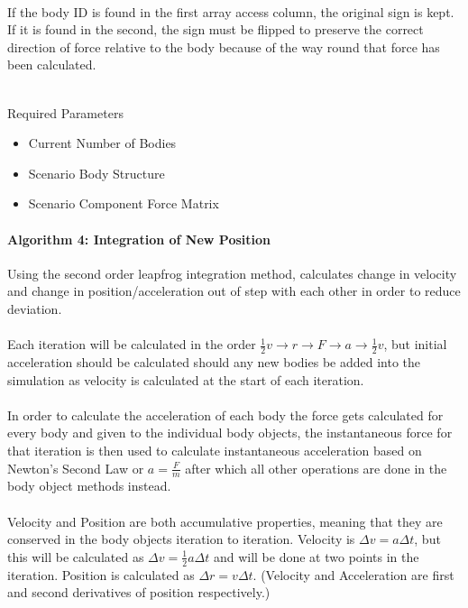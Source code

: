 \paragraph{} If the body ID is found in the first array access column, the original sign is kept. If it is found in the second, the sign must be flipped to preserve the correct direction of force relative to the body because of the way round that force has been calculated. \\\

Required Parameters
\begin{itemize}
\item Current Number of Bodies
\item Scenario Body Structure
\item Scenario Component Force Matrix
\end{itemize}

\pagebreak
\paragraph{Algorithm 4: Integration of New Position}
Using the second order leapfrog integration method, calculates change in velocity and change in position/acceleration out of step with each other in order to reduce deviation.

\paragraph{}
Each iteration will be calculated in the order $\frac{1}{2}v \rightarrow r \rightarrow F \rightarrow a \rightarrow \frac{1}{2}v$, but initial acceleration should be calculated should any new bodies be added into the simulation as velocity is calculated at the start of each iteration.

\paragraph{}
In order to calculate the acceleration of each body the force gets calculated for every body and given to the individual body objects, the instantaneous force for that iteration is then used to calculate instantaneous acceleration based on Newton's Second Law or $a=\frac{F}{m}$ after which all other operations are done in the body object methods instead.

\paragraph{}
Velocity and Position are both accumulative properties, meaning that they are conserved in the body objects iteration to iteration. Velocity is $\Delta{v}=a\Delta{t}$, but this will be calculated as $\Delta{v}=\frac{1}{2}a\Delta{t}$ and will be done at two points in the iteration. Position is calculated as $\Delta{r}=v\Delta{t}$. (Velocity and Acceleration are first and second derivatives of position respectively.) \\\

